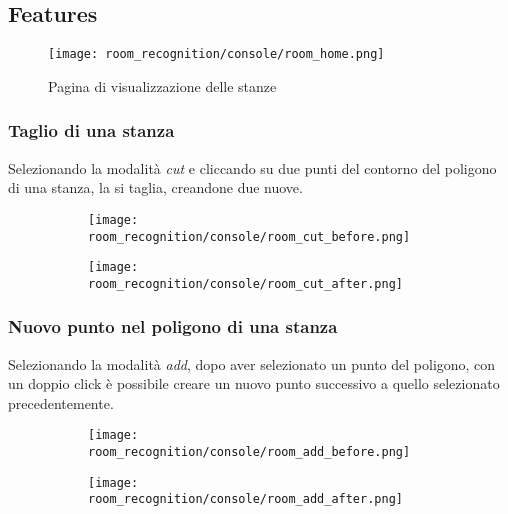 \subsection{Features}
\begin{figure}[H]
  \centering
  \texttt{[image: room\_recognition/console/room\_home.png]}
  \caption{Pagina di visualizzazione delle stanze}
\end{figure}

\protect
\subsubsection{Taglio di una stanza}
Selezionando la modalità \textit{cut} e cliccando su due punti del contorno del poligono di una stanza, la si taglia, creandone due nuove.
\begin{figure}[H]
  \begin{subfigure}[t]{0.50\textwidth}
    \centering
    \texttt{[image: room\_recognition/console/room\_cut\_before.png]}
  \end{subfigure}
  \begin{subfigure}[t]{0.50\textwidth}
    \centering
    \texttt{[image: room\_recognition/console/room\_cut\_after.png]}
  \end{subfigure}
\end{figure}

\protect
\subsubsection{Nuovo punto nel poligono di una stanza}
Selezionando la modalità \textit{add}, dopo aver selezionato un punto del poligono, con un doppio click è possibile creare un nuovo punto successivo a quello selezionato precedentemente.
\begin{figure}[H]
  \begin{subfigure}[t]{0.50\textwidth}
    \centering
    \texttt{[image: room\_recognition/console/room\_add\_before.png]}
  \end{subfigure}
  \begin{subfigure}[t]{0.50\textwidth}
    \centering
    \texttt{[image: room\_recognition/console/room\_add\_after.png]}
  \end{subfigure}
\end{figure}

\protect
